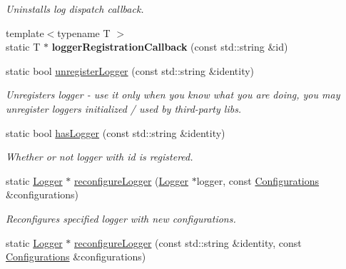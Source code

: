 \begin{DoxyCompactItemize}
\begin{DoxyCompactList}\small\item\em Uninstalls log dispatch callback. \end{DoxyCompactList}\item 
\hypertarget{classel_1_1Loggers_a0423bed2865b6dcd2422e6f8678829d1}{{\footnotesize template$<$typename T $>$ }\\static T $\ast$ {\bfseries logger\-Registration\-Callback} (const std\-::string \&id)}\label{classel_1_1Loggers_a0423bed2865b6dcd2422e6f8678829d1}

\item 
\hypertarget{classel_1_1Loggers_a201d261ea57c070f07f0bf2006158587}{static bool \hyperlink{classel_1_1Loggers_a201d261ea57c070f07f0bf2006158587}{unregister\-Logger} (const std\-::string \&identity)}\label{classel_1_1Loggers_a201d261ea57c070f07f0bf2006158587}

\begin{DoxyCompactList}\small\item\em Unregisters logger -\/ use it only when you know what you are doing, you may unregister loggers initialized / used by third-\/party libs. \end{DoxyCompactList}\item 
\hypertarget{classel_1_1Loggers_a2d7a056cb7d9da3d96c709a2fac5c2bb}{static bool \hyperlink{classel_1_1Loggers_a2d7a056cb7d9da3d96c709a2fac5c2bb}{has\-Logger} (const std\-::string \&identity)}\label{classel_1_1Loggers_a2d7a056cb7d9da3d96c709a2fac5c2bb}

\begin{DoxyCompactList}\small\item\em Whether or not logger with id is registered. \end{DoxyCompactList}\item 
\hypertarget{classel_1_1Loggers_a888aca5bdccccc322da2eed430909d04}{static \hyperlink{classel_1_1Logger}{Logger} $\ast$ \hyperlink{classel_1_1Loggers_a888aca5bdccccc322da2eed430909d04}{reconfigure\-Logger} (\hyperlink{classel_1_1Logger}{Logger} $\ast$logger, const \hyperlink{classel_1_1Configurations}{Configurations} \&configurations)}\label{classel_1_1Loggers_a888aca5bdccccc322da2eed430909d04}

\begin{DoxyCompactList}\small\item\em Reconfigures specified logger with new configurations. \end{DoxyCompactList}\item 
\hypertarget{classel_1_1Loggers_a105f776fe19cb7fa2fccd2993d9f7a7c}{static \hyperlink{classel_1_1Logger}{Logger} $\ast$ \hyperlink{classel_1_1Loggers_a105f776fe19cb7fa2fccd2993d9f7a7c}{reconfigure\-Logger} (const std\-::string \&identity, const \hyperlink{classel_1_1Configurations}{Configurations} \&configurations)}\label{classel_1_1Loggers_a105f776fe19cb7fa2fccd2993d9f7a7c}


\end{DoxyCompactItemize}
